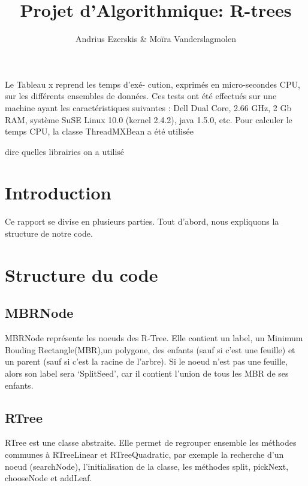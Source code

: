 \documentclass[utf8]{article}
\begin{document}
\begin{titlepage}


  \author{Andrius Ezerskis \& Moïra Vanderslagmolen}
  \title{Projet d'Algorithmique: R-trees}
  \maketitle
\end{titlepage}
\tableofcontents
\newpage
\begin{large}
  Le Tableau x reprend les temps d’exé-
  cution, exprimés en micro-secondes CPU,
  sur les différents ensembles de données.
  Ces tests ont été effectués sur une machine
  ayant les caractéristiques suivantes : Dell
  Dual Core, 2.66 GHz, 2 Gb RAM, système
  SuSE Linux 10.0 (kernel 2.4.2), java 1.5.0,
  etc. Pour calculer le temps CPU, la classe
  ThreadMXBean a été utilisée


  dire quelles librairies on a utilisé


  \section{Introduction}
  \indent
  \par
  Ce rapport se divise en plusieurs parties. Tout d'abord, nous expliquons la
  structure de notre code.

  \par
  \section{Structure du code}

  \par
  \subsection{MBRNode}
  \par
  \indent
  MBRNode représente les noeuds des R-Tree. Elle contient un label, un Minimum Bouding Rectangle(MBR),un polygone,
  des enfants (sauf si c'est une feuille) et un parent (sauf si c'est la racine de
  l'arbre). Si le noeud n'est pas une feuille, alors son label sera `SplitSeed',
  car il contient l'union de tous les MBR de ses enfants.



  \subsection{RTree}
  \par
  \indent
  RTree est une classe abstraite. Elle permet de regrouper ensemble les méthodes
  communes à RTreeLinear et RTreeQuadratic, par exemple la recherche d'un noeud
  (searchNode), l'initialisation de la classe, les méthodes split, pickNext,
  chooseNode et addLeaf.





\end{large}
\end{document}
